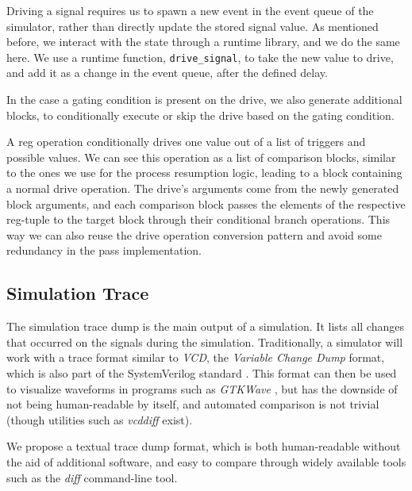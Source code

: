 Driving a signal requires us to spawn a new event in the event queue of the simulator, rather than directly update the stored signal value. As mentioned before, we interact with the state through a runtime library, and we do the same here. We use a runtime function, \texttt{drive\_signal}, to take the new value to drive, and add it as a change in the event queue, after the defined delay.

In the case a gating condition is present on the drive, we also generate additional blocks, to conditionally execute or skip the drive based on the gating condition.

A reg operation conditionally drives one value out of a list of triggers and possible values. We can see this operation as a list of comparison blocks, similar to the ones we use for the process resumption logic, leading to a block containing a normal drive operation. The drive's arguments come from the newly generated block arguments, and each comparison block passes the elements of the respective reg-tuple to the target block through their conditional branch operations. This way we can also reuse the drive operation conversion pattern and avoid some redundancy in the pass implementation.





\subsection{Simulation Trace}
\label{sec:trace}
The simulation trace dump is the main output of a simulation. It lists all changes that occurred on the signals during the simulation. Traditionally, a simulator will work with a trace format similar to \textit{VCD}, the \textit{Variable Change Dump} format, which is also part of the SystemVerilog standard \cite{SV2018}. This format can then be used to visualize waveforms in programs such as \textit{GTKWave} \cite{gtkwave}, but has the downside of not being human-readable by itself, and automated comparison is not trivial (though utilities such as \textit{vcddiff} \cite{vcddiff} exist).

We propose a textual trace dump format, which is both human-readable without the aid of additional software, and easy to compare through widely available tools such as the \textit{diff} command-line tool.


